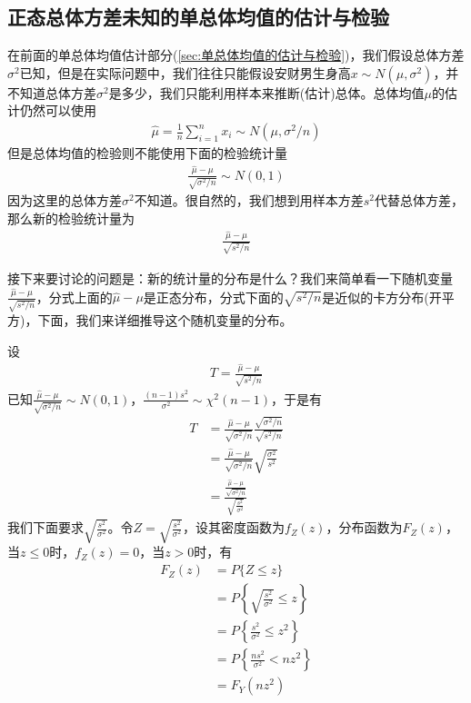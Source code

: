     \subsection{正态总体方差未知的单总体均值的估计与检验}
        \par
        在前面的单总体均值估计部分(\ref{sec:单总体均值的估计与检验})，我们假设总体方差$\sigma^2$已知，但是在实际问题中，我们往往只能假设安财男生身高$x\sim N(\mu,\sigma^2)$，并不知道总体方差$\sigma^2$是多少，我们只能利用样本来推断(估计)总体。总体均值$\mu$的估计仍然可以使用
        \begin{align*}
        \hat{\mu}=\frac{1}{n} \sum_{i  =1}^n x_i \sim N(\mu,\sigma^2/n)
        \end{align*}
        但是总体均值的检验则不能使用下面的检验统计量
        \begin{align*}
        \frac{\hat{\mu} - \mu}{\sqrt{\sigma^2/n}} \sim N(0,1)
        \end{align*}
        因为这里的总体方差$\sigma^2$不知道。很自然的，我们想到用样本方差$s^2$代替总体方差，那么新的检验统计量为
        \begin{align*}
        \frac{\hat{\mu} - \mu}{\sqrt{s^2/n}}
        \end{align*}
        \par
        接下来要讨论的问题是：新的统计量的分布是什么？我们来简单看一下随机变量$\frac{\hat{\mu} - \mu}{\sqrt{s^2/n}}$，分式上面的$\hat{\mu} - \mu$是正态分布，分式下面的$\sqrt{s^2/n}$是近似的卡方分布(开平方)，下面，我们来详细推导这个随机变量的分布。
        \par
        设
        \begin{align*}
        T = \frac{\hat{\mu} - \mu}{\sqrt{s^2/n}}
        \end{align*}
        已知$\frac{\hat{\mu} - \mu}{\sqrt{\sigma^2/n}}\sim N(0,1)$，$\frac{(n-1)s^2}{\sigma^2} \sim \chi ^2(n-1)$，于是有
        \begin{align*}
        T &= \frac{\hat{\mu} - \mu}{\sqrt{\sigma^2/n}} \frac{\sqrt{\sigma^2/n}}{\sqrt{s^2/n}}\\
        &= \frac{\hat{\mu} - \mu}{\sqrt{\sigma^2/n}}\sqrt{\frac{\sigma^2}{s^2}}\\
        &=\frac{\frac{\hat{\mu} - \mu}{\sqrt{\sigma^2/n}}}{\sqrt{\frac{s^2}{\sigma^2}}}
        \end{align*}
        我们下面要求$\sqrt{\frac{s^2}{\sigma^2}}$。令$Z = \sqrt{\frac{s^2}{\sigma^2}}$，设其密度函数为$f_Z(z)$，分布函数为$F_Z(z)$，当$z \leqslant 0$时，$f_Z(z) = 0$，当$z>0$时，有
        \begin{align*}
        F_Z(z) &= P\{Z \leqslant z\}\\
        &=P\left\{\sqrt{\frac{s^2}{\sigma^2}} \leqslant z\right\}\\
        &=P\left\{\frac{s^2}{\sigma^2}\leqslant z^2\right\}\\
        &=P\left\{ \frac{ns^2}{\sigma^2}<n z^2 \right\}\\
        &=F_Y(nz^2)
        \end{align*}
